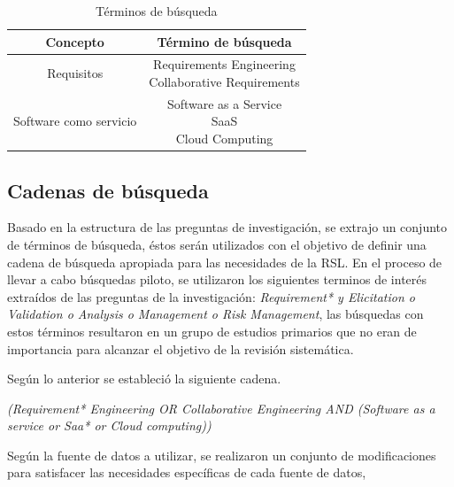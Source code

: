\documentclass{article}
\begin{document}
\begin{table}[ht]
        \caption{Términos de búsqueda} 
        \centering 
        \begin{tabular}{c c}
                \hline
                Concepto & Término de búsqueda\\ [0.5ex] %
                \hline
                Requisitos             & \makecell{Requirements Engineering \\
                                                   Collaborative Requirements} \\
                \hline 
                Software como servicio & \makecell{Software as a Service \\
                                                   SaaS \\
                                                   Cloud Computing }\\ [1ex]
                \hline 
        \end{tabular}
        \label{table:tablaterminos}
\end{table}
\newpage

\subsection{Cadenas de búsqueda}
Basado en la estructura de las preguntas de investigación, se extrajo un conjunto de 
términos de búsqueda, éstos serán utilizados con el objetivo de definir una cadena de búsqueda apropiada para 
las necesidades de la RSL. 
En el proceso de llevar a cabo búsquedas piloto, se utilizaron los siguientes terminos de interés extraídos de las preguntas de la investigación: 
\emph{Requirement* y Elicitation o Validation o Analysis o Management o Risk Management}, las búsquedas con estos 
términos resultaron en un grupo de estudios primarios que no eran de importancia para alcanzar el objetivo de la 
revisión sistemática. 

Según lo anterior se estableció la siguiente cadena.

\emph{(Requirement* Engineering OR Collaborative Engineering AND (Software as a service or Saa* or Cloud computing))}

Según la fuente de datos a utilizar, se realizaron un conjunto de modificaciones para satisfacer las necesidades específicas de cada fuente de datos,
\end{document}
